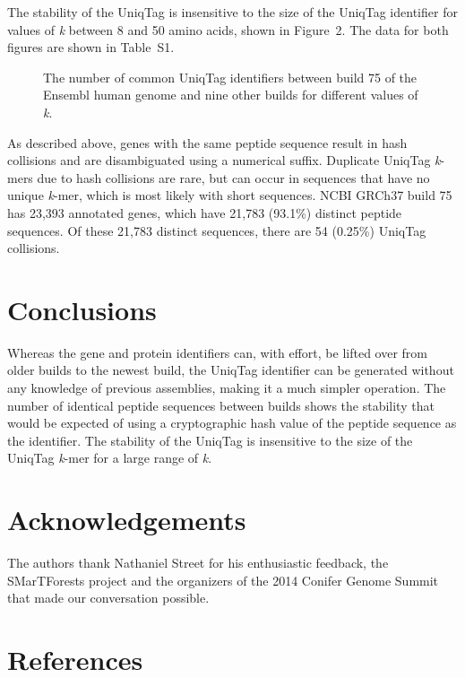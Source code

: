 \documentclass[10pt]{article}
\begin{document}
The stability of the UniqTag is insensitive to the size of the UniqTag
identifier for values of \emph{k} between 8 and 50 amino acids, shown in
Figure~2. The data for both figures are shown in Table~S1.

\begin{figure}[htbp]
\centering
\caption{The number of common UniqTag identifiers between build 75 of
the Ensembl human genome and nine other builds for different values of
\emph{k}.}
\end{figure}

As described above, genes with the same peptide sequence result in hash
collisions and are disambiguated using a numerical suffix. Duplicate
UniqTag \emph{k}-mers due to hash collisions are rare, but can occur in
sequences that have no unique \emph{k}-mer, which is most likely with
short sequences. NCBI GRCh37 build 75 has 23,393 annotated genes, which
have 21,783 (93.1\%) distinct peptide sequences. Of these 21,783
distinct sequences, there are 54 (0.25\%) UniqTag collisions.

\section{Conclusions}\label{conclusions}

Whereas the gene and protein identifiers can, with effort, be lifted
over from older builds to the newest build, the UniqTag identifier can
be generated without any knowledge of previous assemblies, making it a
much simpler operation. The number of identical peptide sequences
between builds shows the stability that would be expected of using a
cryptographic hash value of the peptide sequence as the identifier. The
stability of the UniqTag is insensitive to the size of the UniqTag
\emph{k}-mer for a large range of \emph{k}.

\section{Acknowledgements}\label{acknowledgements}

The authors thank Nathaniel Street for his enthusiastic feedback, the
SMarTForests project and the organizers of the 2014 Conifer Genome
Summit that made our conversation possible.

\section{References}\label{references}
\end{document}
